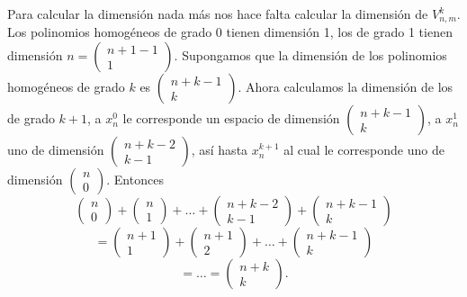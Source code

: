 \documentclass{report}
\theoremstyle{definition}
\begin{document}
\begin{enumerate}
Para calcular la dimensi\'on nada m\'as nos hace falta calcular la dimensi\'on de $V_{n , m}^k$. Los polinomios homog\'eneos de grado 0 tienen dimensi\'on 1, los de grado 1 tienen dimensi\'on $n= \begin{pmatrix} n + 1 - 1 \\ 1 \end{pmatrix}$. Supongamos que la dimensi\'on de los polinomios homog\'eneos de grado $k$ es $\begin{pmatrix} n + k - 1 \\ k \end{pmatrix}$. Ahora calculamos la dimensi\'on de los de grado $k+1$, a $x_n^0$ le corresponde un espacio de dimensi\'on $\begin{pmatrix} n + k -1 \\ k \end{pmatrix}$, a $x_n^1$ uno de dimensi\'on $\begin{pmatrix} n + k - 2 \\ k -1 \end{pmatrix}$, as\'i hasta $x_n^{k+1}$ al cual le corresponde uno de dimensi\'on $\begin{pmatrix} n \\ 0 \end{pmatrix}$. Entonces 
$$\begin{pmatrix} n \\ 0 \end{pmatrix} + \begin{pmatrix} n \\ 1 \end{pmatrix} + \dots + \begin{pmatrix} n + k - 2 \\ k-1 \end{pmatrix} + \begin{pmatrix} n+k-1 \\ k \end{pmatrix} $$
$$=\begin{pmatrix} n + 1 \\ 1 \end{pmatrix} + \begin{pmatrix} n + 1 \\ 2 \end{pmatrix} + \dots + \begin{pmatrix} n + k -1 \\ k \end{pmatrix} $$
$$= \dots = \begin{pmatrix}
n + k \\ k
\end{pmatrix}.$$


\end{enumerate}
\end{document}
